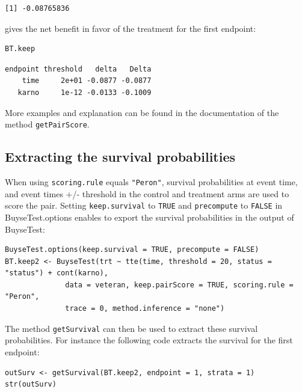 \documentclass[12pt]{article}
\begin{document}
\begin{verbatim}
[1] -0.08765836
\end{verbatim}


gives the net benefit in favor of the treatment for the first
endpoint:
\lstset{language=r,label= ,caption= ,captionpos=b,numbers=none}
\begin{lstlisting}
BT.keep
\end{lstlisting}

\begin{verbatim}
endpoint threshold   delta   Delta
    time     2e+01 -0.0877 -0.0877
   karno     1e-12 -0.0133 -0.1009
\end{verbatim}


More examples and explanation can be found in the documentation of
the method \texttt{getPairScore}.

\subsection{Extracting the survival probabilities}
\label{sec:orgd6141f6}
When using \texttt{scoring.rule} equals \texttt{"Peron"}, survival probabilities at
event time, and event times +/- threshold in the control and treatment
arms are used to score the pair. Setting \texttt{keep.survival} to \texttt{TRUE} and
\texttt{precompute} to \texttt{FALSE} in BuyseTest.options enables to export the
survival probabilities in the output of BuyseTest:
\lstset{language=r,label= ,caption= ,captionpos=b,numbers=none}
\begin{lstlisting}
BuyseTest.options(keep.survival = TRUE, precompute = FALSE)
BT.keep2 <- BuyseTest(trt ~ tte(time, threshold = 20, status = "status") + cont(karno),
		      data = veteran, keep.pairScore = TRUE, scoring.rule = "Peron",
		      trace = 0, method.inference = "none")
\end{lstlisting}

The method \texttt{getSurvival} can then be used to extract these survival
probabilities. For instance the following code extracts the survival
for the first endpoint:
\lstset{language=r,label= ,caption= ,captionpos=b,numbers=none}
\begin{lstlisting}
outSurv <- getSurvival(BT.keep2, endpoint = 1, strata = 1)
str(outSurv)
\end{lstlisting}
\end{document}
